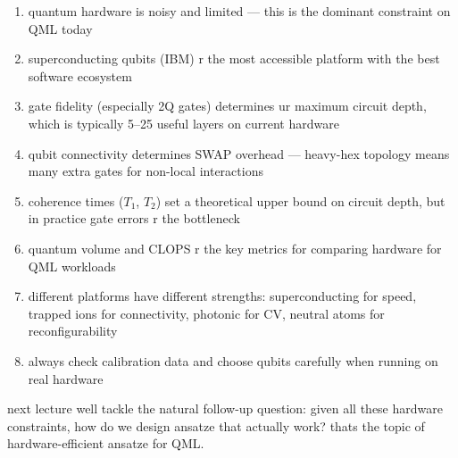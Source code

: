 \documentclass[11pt,a4paper]{article}
\theoremstyle{definition}
\theoremstyle{remark}
\begin{document}
\begin{enumerate}[label=\arabic*.]
    \item quantum hardware is noisy and limited --- this is the dominant constraint on QML today
    \item superconducting qubits (IBM) r the most accessible platform with the best software ecosystem
    \item gate fidelity (especially 2Q gates) determines ur maximum circuit depth, which is typically 5--25 useful layers on current hardware
    \item qubit connectivity determines SWAP overhead --- heavy-hex topology means many extra gates for non-local interactions
    \item coherence times ($T_1$, $T_2$) set a theoretical upper bound on circuit depth, but in practice gate errors r the bottleneck
    \item quantum volume and CLOPS r the key metrics for comparing hardware for QML workloads
    \item different platforms have different strengths: superconducting for speed, trapped ions for connectivity, photonic for CV, neutral atoms for reconfigurability
    \item always check calibration data and choose qubits carefully when running on real hardware
\end{enumerate}

next lecture well tackle the natural follow-up question: given all these hardware constraints, how do we design ansatze that actually work? thats the topic of hardware-efficient ansatze for QML.
\end{document}
